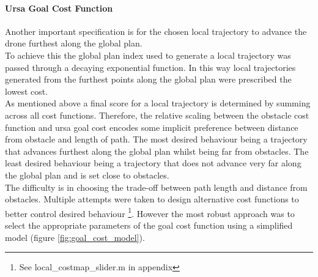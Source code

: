 \documentclass[capstone_report.tex]{subfiles}
\begin{document}
\paragraph{Ursa Goal Cost Function}
Another important specification is for the chosen local trajectory to advance the drone furthest along the global plan.\\

To achieve this the global plan index used to generate a local trajectory was passed through a decaying exponential function.  In this way local trajectories generated from the furthest points along the global plan were prescribed the lowest cost.  \\



As mentioned above a final score for a local trajectory is determined by summing across all cost functions.  Therefore, the relative scaling between the obstacle cost function and ursa goal cost encodes some implicit preference between distance from obstacle and length of path.  The most desired behaviour being a trajectory that advances furthest along the global plan whilst being far from obstacles.  The least desired behaviour being a trajectory that does not advance very far along the global plan and is set close to obstacles.\\

The difficulty is in choosing the trade-off between path length and distance from obstacles.  Multiple attempts were taken to design alternative cost functions to better control desired behaviour \footnote{See local\_costmap\_slider.m in appendix}.  However the most robust approach was to select the appropriate parameters of the goal cost function using a simplified model (figure \ref{fig:goal_cost_model}). 
\end{document}
